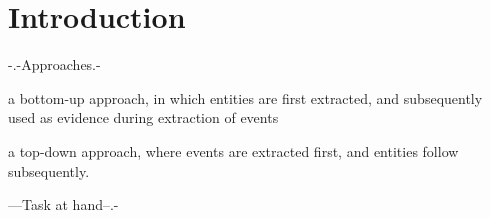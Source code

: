 \section{Introduction}

-.-Approaches.-

a bottom-up approach, in which entities are first extracted, and subsequently used as evidence during extraction of events

a top-down approach, where events are extracted first, and entities follow subsequently. 

---Task at hand--.-